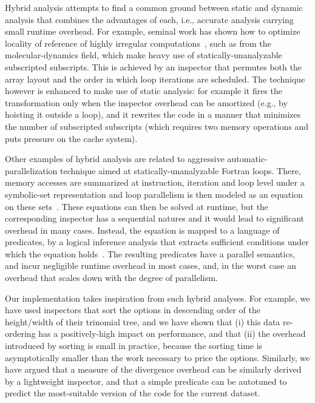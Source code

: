 Hybrid analysis attempts to find a common ground between static and dynamic analysis that combines the advantages of each, i.e., accurate analysis carrying small runtime overhead. For example, seminal work has shown how to optimize locality of reference of highly irregular computations~\cite{Kennedy:DataReord,Strout:DataItReord}, such as from the molecular-dynamics field, which make heavy use of statically-unanalyzable subscripted subscripts. This is achieved by an inspector that permutes both the array layout and the order in which loop iterations are scheduled.  The technique however is enhanced to make use of static analysis: for example it fires the transformation only when the inspector overhead can be amortized (e.g., by hoisting it outside a loop), and it rewrites the code in a manner that minimizes the number of subscripted subscripts (which requires two memory operations and puts pressure on the cache system).

Other examples of hybrid analysis are related to aggressive automatic-parallelization technique aimed at statically-unanalyzable Fortran loops. There, memory accesses are summarized at instruction, iteration and loop level under a symbolic-set representation and loop parallelism is then modeled as an equation on these sets~\cite{SUIF,HybAn}. These equations can then be solved at runtime, but the corresponding inspector has a sequential natures and it would lead to significant overhead in many cases. Instead, the equation is mapped to a language of predicates, by a logical inference analysis that extracts sufficient conditions under which the equation holds~\cite{Moon99PredArrDataFlow,SummaryMonot}. The resulting predicates have a parallel semantics, and incur negligible runtime overhead in most cases, and, in the worst case an overhead that scales down with the degree of parallelism.    

Our implementation takes inspiration from such hybrid analyses. For example, we have used inspectors that sort the options in descending order of the height/width of their trinomial tree, and we have shown that (i) this data re-ordering has a positively-high impact on performance, and that (ii) the overhead introduced by sorting is small in practice, because the sorting time is asymptotically smaller than the work necessary to price the options. Similarly, we have argued that a measure of the divergence overhead can be similarly derived by a lightweight inspector, and that a simple predicate can be autotuned to predict the most-suitable version of the code for the current dataset.


